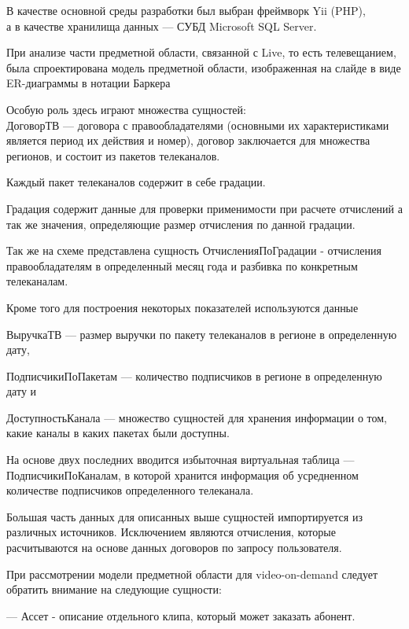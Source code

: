 \documentclass[a4paper]{article}
\begin{document}
В качестве основной среды разработки был выбран фреймворк Yii (PHP),\\
а в качестве хранилища данных --- СУБД Microsoft SQL Server.\\

\newpage

При анализе части предметной области, связанной с Live, то есть телевещанием, была спроектирована модель предметной области, изображенная на слайде в виде
ER-диаграммы в нотации Баркера

Особую роль здесь играют множества сущностей:\\

ДоговорТВ --- договора с правообладателями (основными их характеристиками является период их действия и номер), договор заключается  
для множества регионов, и состоит из пакетов телеканалов.

Каждый пакет телеканалов содержит в себе градации.

Градация содержит данные для проверки применимости при расчете отчислений а так же значения, определяющие размер отчисления по данной градации.

Так же на схеме представлена сущность ОтчисленияПоГрадации - отчисления правообладателям
 в определенный месяц года и разбивка по конкретным телеканалам.

\newpage

Кроме того для построения некоторых показателей используются данные 

ВыручкаТВ --- размер выручки по пакету телеканалов в регионе в определенную дату, 

ПодписчикиПоПакетам --- количество подписчиков в регионе в определенную дату и 

ДоступностьКанала
 --- множество сущностей для хранения информации о том, какие каналы в каких пакетах были доступны.

На основе двух последних вводится избыточная виртуальная таблица --- ПодписчикиПоКаналам, 
в которой хранится информация об усредненном количестве подписчиков определенного телеканала.

Большая часть данных для описанных выше сущностей импортируется из различных источников.
Исключением являются отчисления, которые расчитываются на основе данных договоров по запросу пользователя.

\newpage

При рассмотрении модели предметной области для video-on-demand следует обратить внимание на следующие сущности:

--- Ассет - описание отдельного клипа, который может заказать абонент.
\end{document}
